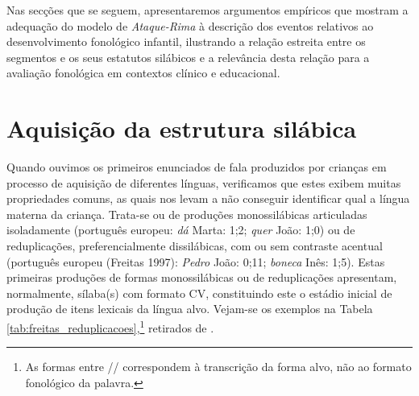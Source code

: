 \documentclass[output=paper]{LSP/langsci}
\begin{document}
\begin{exe}
\end{exe}

Nas secções que se seguem, apresentaremos argumentos empíricos que mostram a adequação do modelo de \textit{Ataque-Rima} à descrição dos eventos relativos ao desenvolvimento fonológico infantil, ilustrando a relação estreita entre os segmentos e os seus estatutos silábicos e a relevância desta relação para a avaliação fonológica em contextos clínico e educacional.

\section{Aquisição da estrutura silábica}
\label{sec:freitas_aquisicao}

Quando ouvimos os primeiros enunciados de fala produzidos por crianças em processo de aquisição de diferentes línguas, verificamos que estes exibem muitas propriedades comuns, as quais nos levam a não conseguir identificar qual a língua materna da criança. Trata-se ou de produções monossilábicas articuladas isoladamente (português europeu: \textit{dá} \textipa{[\textprimstress da]} Marta: 1;2; \textit{quer} \textipa{[\textprimstress kE]} João: 1;0) ou de reduplicações, preferencialmente dissilábicas, com ou sem contraste acentual (português europeu (Freitas 1997): \textit{Pedro} \textipa{[tete]} João: 0;11; \textit{boneca} \textipa{[ne\textprimstress nE]} Inês: 1;5). Estas primeiras produções de formas monossilábicas ou de reduplicações apresentam, normalmente, sílaba(s) com formato CV, constituindo este o estádio inicial de produção de itens lexicais da língua alvo. Vejam-se os exemplos na Tabela \ref{tab:freitas_reduplicacoes},\footnote{As formas entre // correspondem à transcrição da forma alvo, não ao formato fonológico da palavra.} retirados de \citet[2--5]{johnsonreimers2010}.
\end{document}
